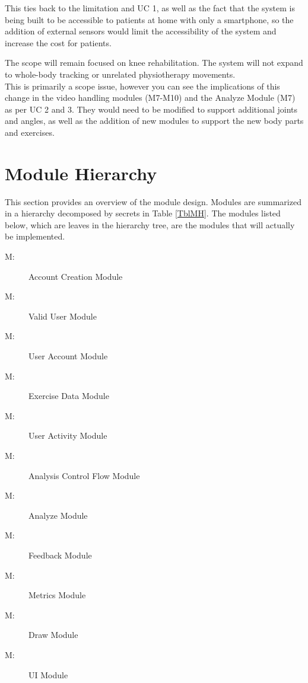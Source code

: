 \documentclass[12pt, titlepage]{article}
\newcounter{ucnum}
\newcommand{\uctheucnum}{UC\theucnum}
\newcounter{mnum}
\newcommand{\mthemnum}{M\themnum}
\begin{document}
\begin{description}
This ties back to the limitation and UC 1, as well as the fact that the system is being built to be accessible to patients at home with only a smartphone, so the addition of external sensors would limit the accessibility of the system and increase the cost for patients.
\item[\refstepcounter{ucnum} \uctheucnum \label{ucIO}:] The scope will remain focused on knee rehabilitation. The system will not expand to whole-body tracking or unrelated physiotherapy movements. \\
This is primarily a scope issue, however you can see the implications of this change in the video handling modules (M7-M10) and the Analyze Module (M7) as per UC 2 and 3. They would need to be modified to support additional joints and angles, as well as the addition of new modules to support the new body parts and exercises.
\end{description}

\section{Module Hierarchy} \label{SecMH}

This section provides an overview of the module design. Modules are summarized
in a hierarchy decomposed by secrets in Table \ref{TblMH}. The modules listed
below, which are leaves in the hierarchy tree, are the modules that will
actually be implemented.

\begin{description}
\item [ \mthemnum \label{mHH}:] Account Creation Module
\item [ \mthemnum \label{mHH}:] Valid User Module
\item [ \mthemnum \label{mHH}:] User Account Module
\item [ \mthemnum \label{mHH}:] Exercise Data Module
\item [ \mthemnum \label{mHH}:] User Activity Module
\item [ \mthemnum \label{mHH}:] Analysis Control Flow Module
\item [ \mthemnum \label{mHH}:] Analyze Module
\item [ \mthemnum \label{mHH}:] Feedback Module
\item [ \mthemnum \label{mHH}:] Metrics Module
\item [ \mthemnum \label{mHH}:] Draw Module
\item [ \mthemnum \label{mHH}:] UI Module
\end{description}
\end{document}
